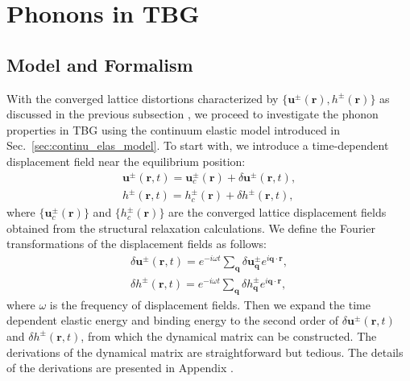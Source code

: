 \documentclass[aps,prx,10pt,twocolumn,superscriptaddress]{revtex4}
\def\IV{{\uppercase\expandafter{\romannumeral 4}}}
\begin{document}
\section{Phonons in TBG}

\subsection{Model and Formalism}
\label{sec:phonon}
With the converged lattice distortions characterized by $\{\bm{u}^{\pm}(\mathbf{r}), h^{\pm}(\mathbf{r})\}$ as discussed in the previous subsection%
, we proceed to investigate the phonon properties in TBG using the continuum elastic model introduced in Sec.~\ref{sec:continu_elas_model}.  
To start with, we introduce a time-dependent displacement field near the equilibrium position:
\begin{equation}
\begin{split}
\textbf{u}^{\pm}(\textbf{r},t)=\textbf{u}^{\pm}_{c}(\textbf{r})+\delta\textbf{u}^{\pm}(\textbf{r},t),\\
h^{\pm}(\textbf{r},t)=h^{\pm}_{c}(\textbf{r})+\delta h^{\pm}(\textbf{r},t),
\end{split}
\end{equation}
where $\{\textbf{u}^{\pm}_{c}(\mathbf{r})\}$ and $\{h^{\pm}_{c}(\mathbf{r})\}$ are the converged lattice displacement fields obtained from the structural relaxation calculations. We define the Fourier transformations of the displacement fields as follows:
%
\begin{equation}
\begin{split}
\delta\textbf{u}^{\pm}(\textbf{r},t)=e^{-i\omega t}\sum_{\textbf{q}}\delta\textbf{u}^{\pm}_{\textbf{q}}e^{i\textbf{q}\cdot\textbf{r}},\\
\delta h^{\pm}(\textbf{r},t)=e^{-i\omega t}\sum_{\textbf{q}}\delta h^{\pm}_{\textbf{q}}e^{i\textbf{q}\cdot\textbf{r}},
\end{split}
\label{eq:phonon-fourier}
\end{equation}
where $\omega$ is the frequency of displacement fields. Then we expand the time dependent elastic energy and binding energy to the second order of $\delta\textbf{u}^{\pm}(\textbf{r},t)$ and $\delta h^{\pm}(\textbf{r},t)$, from which the dynamical matrix can be constructed. The derivations of the dynamical matrix are straightforward but tedious. The details of the derivations are presented in Appendix \IV. 
\end{document}
